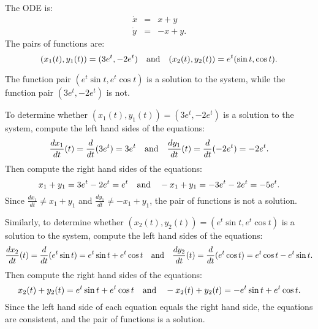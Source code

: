 \documentclass{ximera}
\begin{document}
\begin{exercise} \label{c3.5.5c}
The ODE is:
\begin{eqnarray*}
\dot{x} & = &  x + y \\
\dot{y} & = & -x + y.
\end{eqnarray*}
The pairs of functions are:
\[
(x_1(t),y_1(t)) =  (3e^t, -2e^t) \quad\mbox{and}\quad (x_2(t),y_2(t)) = e^t(\sin t,\cos t).
\]

\begin{solution}
\ans The function pair $(e^t\sin{t},e^t\cos{t})$ is a
solution to the system, while the function pair $(3e^t,-2e^t)$ is not.

\soln To determine whether $(x_1(t),y_1(t)) = (3e^t,-2e^t)$ is
a solution to the system, compute the left hand sides of the equations:
\[
\frac{dx_1}{dt}(t) = \frac{d}{dt}(3e^t) = 3e^t \quad\mbox{and}\quad
\frac{dy_1}{dt}(t) = \frac{d}{dt}(-2e^t) = -2e^t.
\]
Then compute the right hand sides of the equations:
\[
x_1 + y_1 = 3e^t - 2e^t = e^t \quad\mbox{and}\quad
-x_1 + y_1 = -3e^t - 2e^t = -5e^t.
\]
Since $\frac{dx_1}{dt} \neq x_1 + y_1$ and $\frac{dy_1}{dt} \neq -x_1 + y_1$,
the pair of functions is not a solution.

\para Similarly, to determine whether $(x_2(t),y_2(t)) =
(e^t\sin{t},e^t\cos{t})$ is a solution to the system, compute the left
hand sides of the equations:
\[
\frac{dx_2}{dt}(t) = \frac{d}{dt}(e^t\sin{t}) = 
e^t\sin{t} + e^t\cos{t} \quad\mbox{and}\quad
\frac{dy_2}{dt}(t) = \frac{d}{dt}(e^t\cos{t}) =
e^t\cos{t} - e^t\sin{t}.
\]
Then compute the right hand sides of the equations:
\[
x_2(t) + y_2(t) = e^t\sin{t} + e^t\cos{t} \quad\mbox{and}\quad
-x_2(t) + y_2(t) = -e^t\sin{t} + e^t\cos{t}.
\]
Since the left hand side of each equation equals the right hand side, the
equations are consistent, and the pair of functions is a solution.


\end{solution}
\end{exercise}
\end{document}
